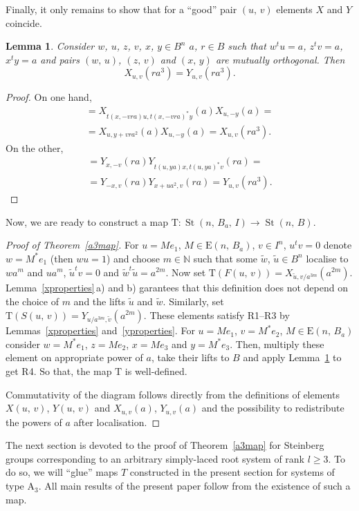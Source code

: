 \documentclass[11pt]{amsart}
\theoremstyle{plain} \declaretheorem[name=Theorem, Refname={Theorem,Theorems}]{tm} \Crefname{tm}{Theorem}{Theorems}
\numberwithin{equation}{section}
\newtheorem{lm}{Lemma} \numberwithin{lm}{section} \Crefname{lm}{Lemma}{Lemmas}
\theoremstyle{definition} \newtheorem{df}[lm]{Definition} \Crefname{df}{Definition}{Definitions}
\theoremstyle{remark} \newtheorem{rk}[lm]{Remark} \Crefname{rk}{Remark}{Remarks}
\newcommand{\E}{{\mathrm{E}}}
\newcommand{\St}{\mathop{\mathrm{St}}\nolimits}
\begin{document}
Finally, it only remains to show that for a ``good'' pair $(u,\,v)$ elements $X$ and $Y$ coincide.

\begin{lm}
\label{x=y}
Consider $w$, $u$, $z$, $v$, $x$, $y\in B^n$ $a$, $r\in B$ such that $w^tu=a$, $z^tv=a$, $x^ty=a$ and pairs $(w,\,u)$, $(z,\,v)$ and $(x,\,y)$ are mutually orthogonal. Then 
$$
X_{u,v}(ra^3)=Y_{u,v}(ra^3).
$$
\end{lm}

\begin{proof}
On one hand,
\begin{multline*}
[Y_{x,-v}(ra),\,X_{u,y}(a)]=X_{t(x,-vra)u,t(x,-vra)^*y}(a)X_{u,-y}(a)=\\
=X_{u,y+vra^2}(a)X_{u,-y}(a)=X_{u,v}(ra^3).
\end{multline*}
On the other,
\begin{multline*}
[Y_{x,-v}(ra),\,X_{u,y}(a)]=Y_{x,-v}(ra)Y_{t(u,ya)x,t(u,ya)^*v}(ra)=\\
=Y_{-x,v}(ra)Y_{x+ua^2,v}(ra)=Y_{u,v}(ra^3).
\end{multline*}
\end{proof}

Now, we are ready to construct a map 
$
\mathrm T\colon\St(n,\,B_a,\,I)\rightarrow\St(n,\,B).
$

\begin{proof}[Proof of Theorem~\ref{a3map}]
For $u=Me_1$, $M\in\E(n,\,B_a)$, $v\in I^n$, $u^tv=0$ denote $w=M^*e_1$ (then $wu=1$) and choose $m\in\mathbb N$ such that some $\tilde w$, $\tilde u\in B^n$ localise to $wa^m$ and $ua^m$, $\tilde u^tv=0$ and $\tilde w^t\tilde u=a^{2m}$. Now set $\mathrm T(F(u,\,v))=X_{\tilde u,v/a^{3m}}(a^{2m})$. Lemma~\ref{xproperties}\,a) and b) garantees that this definition does not depend on the choice of $m$ and the lifts $\tilde u$ and $\tilde w$. Similarly, set $\mathrm T(S(u,\,v))=Y_{u/a^{3m},\tilde v}(a^{2m})$. These elements satisfy R1--R3 by Lemmas~\ref{xproperties} and~\ref{yproperties}. For $u=Me_1$, $v=M^*e_2$, $M\in\E(n,\,B_a)$ consider $w=M^*e_1$, $z=Me_2$, $x=Me_3$ and $y=M^*e_3$. Then, multiply these element on appropriate power of $a$, take their lifts to $B$ and apply Lemma~\ref{x=y} to get R4. So that, the map $\mathrm T$ is well-defined.

Commutativity of the diagram follows directly from the definitions of elements $X(u,\,v)$, $Y(u,\,v)$ and $X_{u,v}(a)$, $Y_{u,v}(a)$ and the possibility to redistribute the powers of $a$ after localisation.
\end{proof}

The next section is devoted to the proof of Theorem~\ref{a3map} for Steinberg groups corresponding to an arbitrary simply-laced root system of rank $l\geq3$. To do so, we will ``glue'' maps $T$ constructed in the present section for systems of type $\mathrm A_3$. All main results of the present paper follow from the existence of such a map.

\printbibliography
\end{document}
